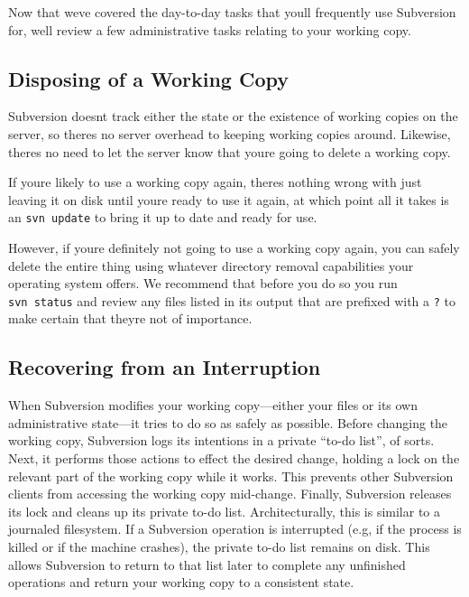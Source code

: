 Now that we\textquotesingle ve covered the day-to-day tasks that
you\textquotesingle ll frequently use Subversion for,
we\textquotesingle ll review a few administrative tasks relating to your
working copy.

\subsection{Disposing of a Working
Copy}\label{svn.tour.cleanup.disposal}

Subversion doesn\textquotesingle t track either the state or the
existence of working copies on the server, so there\textquotesingle s no
server overhead to keeping working copies around. Likewise,
there\textquotesingle s no need to let the server know that
you\textquotesingle re going to delete a working copy.

If you\textquotesingle re likely to use a working copy again,
there\textquotesingle s nothing wrong with just leaving it on disk until
you\textquotesingle re ready to use it again, at which point all it
takes is an \texttt{svn\ update} to bring it up to date and ready for
use.

However, if you\textquotesingle re definitely not going to use a working
copy again, you can safely delete the entire thing using whatever
directory removal capabilities your operating system offers. We
recommend that before you do so you run \texttt{svn\ status} and review
any files listed in its output that are prefixed with a \texttt{?} to
make certain that they\textquotesingle re not of importance.

\subsection{Recovering from an
Interruption}\label{svn.tour.cleanup.interruption}

When Subversion modifies your working copy---either your files or its
own administrative state---it tries to do so as safely as possible.
Before changing the working copy, Subversion logs its intentions in a
private ``to-do list'', of sorts. Next, it performs those actions to
effect the desired change, holding a lock on the relevant part of the
working copy while it works. This prevents other Subversion clients from
accessing the working copy mid-change. Finally, Subversion releases its
lock and cleans up its private to-do list. Architecturally, this is
similar to a journaled filesystem. If a Subversion operation is
interrupted (e.g, if the process is killed or if the machine crashes),
the private to-do list remains on disk. This allows Subversion to return
to that list later to complete any unfinished operations and return your
working copy to a consistent state.

